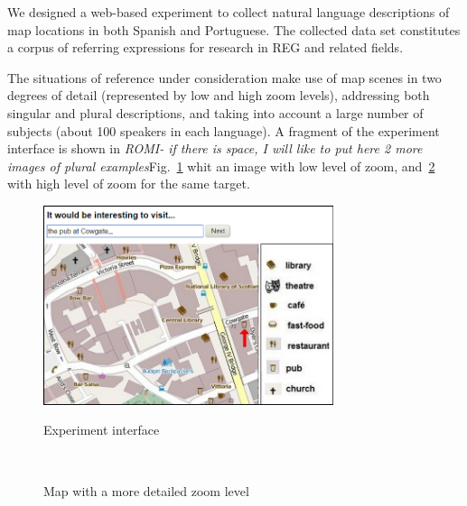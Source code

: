 \documentclass{article}
\begin{document}
We designed a web-based experiment to collect natural language descriptions of map locations in both Spanish and Portuguese. The collected data set constitutes a corpus of referring expressions for research in REG and related fields. 

The situations of reference under consideration make use of map scenes in two degrees of detail (represented by low and high zoom levels), addressing both singular and plural descriptions, and taking into account a large number of subjects (about 100 speakers in each language). A fragment of the experiment interface is shown in {\it ROMI- if there is space, I will like to put here 2 more images of plural examples}Fig.~\ref{fig-interface} whit an image with low level of zoom, and~\ref{fig-with-zoom1} with high level of zoom for the same target.

\begin{figure}[ht]
\begin{center}
\includegraphics[width=8.5cm]{figures/interface.png}\\[0pt]
\caption{Experiment interface}
\label{fig-interface}
\end{center}
\end{figure}

\begin{figure}[ht]
\begin{center}
\\[0pt]
\caption{Map with a more detailed zoom level}
\label{fig-with-zoom1}
\end{center}
\end{figure}
\end{document}
